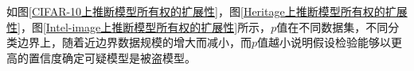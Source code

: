 %		

如图\ref{CIFAR-10上推断模型所有权的扩展性}，图\ref{Heritage上推断模型所有权的扩展性}，图\ref{Intel-image上推断模型所有权的扩展性}所示，$p$值在不同数据集，不同分类边界上，随着近边界数据规模的增大而减小，而$p$值越小说明假设检验能够以更高的置信度确定可疑模型是被盗模型。

